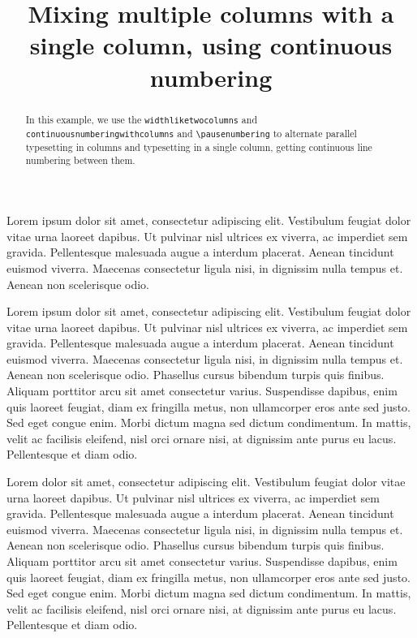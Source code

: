 \documentclass{article}
\begin{document}
\begin{english}
\date{}
\title{Mixing multiple columns with a single column, using continuous numbering}
\begin{abstract}
In this example, we use the \verb+widthliketwocolumns+ and \\ \verb+continuousnumberingwithcolumns+ and \verb+\pausenumbering+ to alternate parallel typesetting in columns and typesetting in a single column, getting continuous line numbering between them.
\end{abstract}
\end{english}
\begin{pairs}  
\begin{Leftside} 
\beginnumbering  
\pstart  
Lorem ipsum dolor sit amet, consectetur adipiscing elit. Vestibulum feugiat dolor vitae urna laoreet dapibus. Ut pulvinar nisl ultrices ex viverra, ac imperdiet sem gravida. Pellentesque malesuada augue a interdum placerat. Aenean tincidunt euismod viverra. Maecenas consectetur ligula nisi, in dignissim nulla tempus et. Aenean non scelerisque odio. 
\pend  
\pausenumbering
\end{Leftside} 

\begin{Rightside}   
\beginnumbering  
\pstart  
Lorem ipsum dolor sit amet, consectetur adipiscing elit. Vestibulum feugiat dolor vitae urna laoreet dapibus. Ut pulvinar nisl ultrices ex viverra, ac imperdiet sem gravida. Pellentesque malesuada augue a interdum placerat. Aenean tincidunt euismod viverra. Maecenas consectetur ligula nisi, in dignissim nulla tempus et. Aenean non scelerisque odio. Phasellus cursus bibendum turpis quis finibus. Aliquam porttitor arcu sit amet consectetur varius. Suspendisse dapibus, enim quis laoreet feugiat, diam ex fringilla metus, non ullamcorper eros ante sed justo. Sed eget congue enim. Morbi dictum magna sed dictum condimentum. In mattis, velit ac facilisis eleifend, nisl orci ornare nisi, at dignissim ante purus eu lacus. Pellentesque et diam odio.
\pend  
\pausenumbering
\end{Rightside}  

\end{pairs}  
\Columns

\resumenumbering
\pstart  
Lorem  dolor sit amet, consectetur adipiscing elit. Vestibulum feugiat dolor vitae urna laoreet dapibus. Ut pulvinar nisl ultrices ex viverra, ac imperdiet sem gravida. Pellentesque malesuada augue a interdum placerat. Aenean tincidunt euismod viverra. Maecenas consectetur ligula nisi, in dignissim nulla tempus et. Aenean non scelerisque odio. Phasellus cursus bibendum turpis quis finibus. Aliquam porttitor arcu sit amet consectetur varius. Suspendisse dapibus, enim quis laoreet feugiat, diam ex fringilla metus, non ullamcorper eros ante sed justo. Sed eget congue enim. Morbi dictum magna sed dictum condimentum. In mattis, velit ac facilisis eleifend, nisl orci ornare nisi, at dignissim ante purus eu lacus. Pellentesque et diam odio.
\pend  
\pausenumbering
\end{document}

